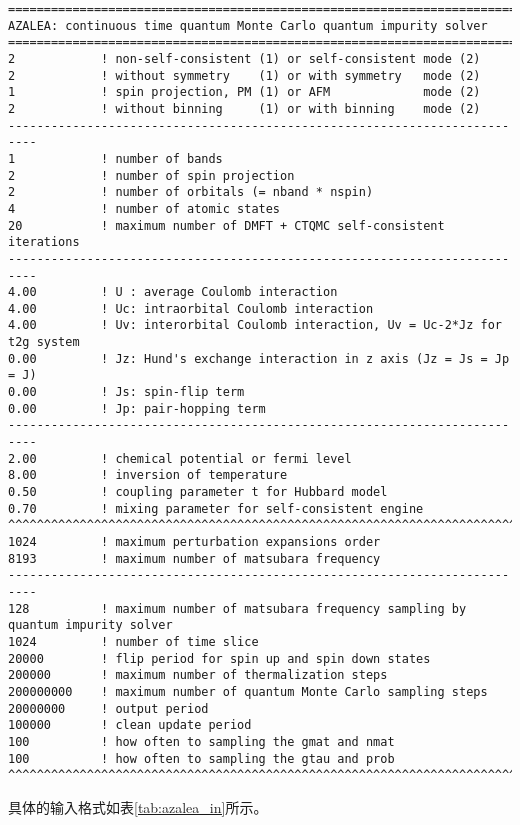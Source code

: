 \begin{lstlisting}[frame=single]
==========================================================================
AZALEA: continuous time quantum Monte Carlo quantum impurity solver
==========================================================================
2            ! non-self-consistent (1) or self-consistent mode (2)
2            ! without symmetry    (1) or with symmetry   mode (2)
1            ! spin projection, PM (1) or AFM             mode (2)
2            ! without binning     (1) or with binning    mode (2)
--------------------------------------------------------------------------
1            ! number of bands
2            ! number of spin projection
2            ! number of orbitals (= nband * nspin)
4            ! number of atomic states
20           ! maximum number of DMFT + CTQMC self-consistent iterations
--------------------------------------------------------------------------
4.00         ! U : average Coulomb interaction
4.00         ! Uc: intraorbital Coulomb interaction
4.00         ! Uv: interorbital Coulomb interaction, Uv = Uc-2*Jz for t2g system
0.00         ! Jz: Hund's exchange interaction in z axis (Jz = Js = Jp = J)
0.00         ! Js: spin-flip term
0.00         ! Jp: pair-hopping term
--------------------------------------------------------------------------
2.00         ! chemical potential or fermi level
8.00         ! inversion of temperature
0.50         ! coupling parameter t for Hubbard model
0.70         ! mixing parameter for self-consistent engine
^^^^^^^^^^^^^^^^^^^^^^^^^^^^^^^^^^^^^^^^^^^^^^^^^^^^^^^^^^^^^^^^^^^^^^^^^^
1024         ! maximum perturbation expansions order
8193         ! maximum number of matsubara frequency
--------------------------------------------------------------------------
128          ! maximum number of matsubara frequency sampling by quantum impurity solver
1024         ! number of time slice
20000        ! flip period for spin up and spin down states
200000       ! maximum number of thermalization steps
200000000    ! maximum number of quantum Monte Carlo sampling steps
20000000     ! output period
100000       ! clean update period
100          ! how often to sampling the gmat and nmat
100          ! how often to sampling the gtau and prob
^^^^^^^^^^^^^^^^^^^^^^^^^^^^^^^^^^^^^^^^^^^^^^^^^^^^^^^^^^^^^^^^^^^^^^^^^^
\end{lstlisting}

具体的输入格式如表\ref{tab:azalea_in}所示。


